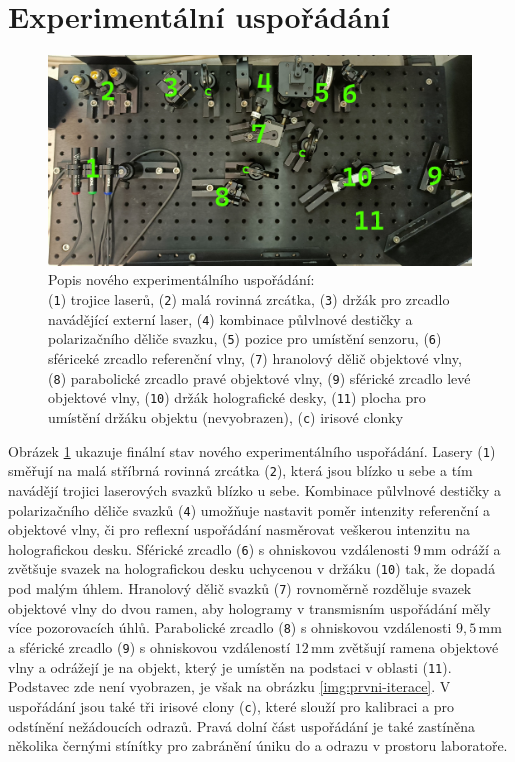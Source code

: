 \documentclass[twoside,project]{../MFFPrace}
\begin{document}
\section{Experimentální uspořádání\label{sec:usporadani}}
\begin{figure}[ht]
    \centering
    \includegraphics[width=\linewidth]{../img/nove-usporadani-popis.jpg}
    \caption{
        Popis nového experimentálního uspořádání:\\
        (\texttt{1}) trojice laserů, (\texttt{2}) malá rovinná zrcátka, (\texttt{3}) držák pro zrcadlo navádějící externí laser, (\texttt{4}) kombinace půlvlnové destičky a polarizačního děliče svazku, (\texttt{5}) pozice pro umístění senzoru, (\texttt{6}) sfériceké zrcadlo referenční vlny, (\texttt{7}) hranolový dělič objektové vlny, (\texttt{8}) parabolické zrcadlo pravé objektové vlny, (\texttt{9}) sférické zrcadlo levé objektové vlny, (\texttt{10}) držák holografické desky, (\texttt{11}) plocha pro umístění držáku objektu (nevyobrazen), (\texttt{c}) irisové clonky
    }
    \label{img:nove-usporadani-popis}
\end{figure}
Obrázek \ref{img:nove-usporadani-popis} ukazuje finální stav nového experimentálního uspořádání. Lasery (\texttt{1}) směřují na malá stříbrná rovinná zrcátka (\texttt{2}), která jsou blízko u sebe a tím navádějí trojici laserových svazků blízko u sebe. Kombinace půlvlnové destičky a polarizačního děliče svazků (\texttt{4}) umožňuje nastavit poměr intenzity referenční a objektové vlny, či pro reflexní uspořádání nasměrovat veškerou intenzitu na holografickou desku. Sférické zrcadlo (\texttt{6}) s ohniskovou vzdálenosti $9\,\text{mm}$ odráží a zvětšuje svazek na holografickou desku uchycenou v držáku (\texttt{10}) tak, že dopadá pod malým úhlem. Hranolový dělič svazků (\texttt{7}) rovnoměrně rozděluje svazek objektové vlny do dvou ramen, aby hologramy v transmisním uspořádání měly více pozorovacích úhlů. Parabolické zrcadlo (\texttt{8}) s ohniskovou vzdálenosti $9{,}5\,\text{mm}$ a sférické zrcadlo (\texttt{9}) s ohniskovou vzdáleností $12\,\text{mm}$ zvětšují ramena objektové vlny a odrážejí je na objekt, který je umístěn na podstaci v oblasti (\texttt{11}). Podstavec zde není vyobrazen, je však na obrázku \ref{img:prvni-iterace}. V uspořádání jsou také tři irisové clony (\texttt{c}), které slouží pro kalibraci a pro odstínění nežádoucích odrazů. Pravá dolní část uspořádání je také zastíněna několika černými stínítky pro zabránění úniku do a odrazu v prostoru laboratoře.
\end{document}
